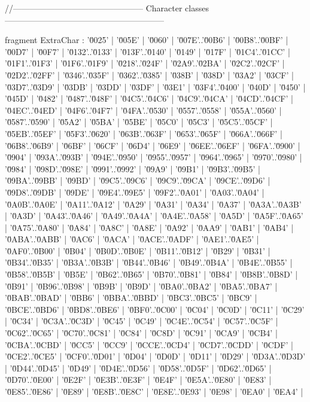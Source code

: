 //----------------------------------------------- Character classes ---------------------------------------------------------


fragment ExtraChar            : '\u0025' | '\u005E' | '\u0060' | '\u007E'..'\u00B6' | '\u00B8'..'\u00BF' | '\u00D7' | '\u00F7' | '\u0132'..'\u0133' | '\u013F'..'\u0140' | '\u0149' | '\u017F' | '\u01C4'..'\u01CC' | '\u01F1'..'\u01F3' | '\u01F6'..'\u01F9' | '\u0218'..'\u024F' | '\u02A9'..'\u02BA' | '\u02C2'..'\u02CF' | '\u02D2'..'\u02FF' | '\u0346'..'\u035F' | '\u0362'..'\u0385' | '\u038B' | '\u038D' | '\u03A2' | '\u03CF' | '\u03D7'..'\u03D9' | '\u03DB' | '\u03DD' | '\u03DF' | '\u03E1' | '\u03F4'..'\u0400' | '\u040D' | '\u0450' | '\u045D' | '\u0482' | '\u0487'..'\u048F' | '\u04C5'..'\u04C6' | '\u04C9'..'\u04CA' | '\u04CD'..'\u04CF' | '\u04EC'..'\u04ED' | '\u04F6'..'\u04F7' | '\u04FA'..'\u0530' | '\u0557'..'\u0558' | '\u055A'..'\u0560' | '\u0587'..'\u0590' | '\u05A2' | '\u05BA' | '\u05BE' | '\u05C0' | '\u05C3' | '\u05C5'..'\u05CF' | '\u05EB'..'\u05EF' | '\u05F3'..'\u0620' | '\u063B'..'\u063F' | '\u0653'..'\u065F' | '\u066A'..'\u066F' | '\u06B8'..'\u06B9' | '\u06BF' | '\u06CF' | '\u06D4' | '\u06E9' | '\u06EE'..'\u06EF' | '\u06FA'..'\u0900' | '\u0904' | '\u093A'..'\u093B' | '\u094E'..'\u0950' | '\u0955'..'\u0957' | '\u0964'..'\u0965' | '\u0970'..'\u0980' | '\u0984' | '\u098D'..'\u098E' | '\u0991'..'\u0992' | '\u09A9' | '\u09B1' | '\u09B3'..'\u09B5' | '\u09BA'..'\u09BB' | '\u09BD' | '\u09C5'..'\u09C6' | '\u09C9'..'\u09CA' | '\u09CE'..'\u09D6' | '\u09D8'..'\u09DB' | '\u09DE' | '\u09E4'..'\u09E5' | '\u09F2'..'\u0A01' | '\u0A03'..'\u0A04' | '\u0A0B'..'\u0A0E' | '\u0A11'..'\u0A12' | '\u0A29' | '\u0A31' | '\u0A34' | '\u0A37' | '\u0A3A'..'\u0A3B' | '\u0A3D' | '\u0A43'..'\u0A46' | '\u0A49'..'\u0A4A' | '\u0A4E'..'\u0A58' | '\u0A5D' | '\u0A5F'..'\u0A65' | '\u0A75'..'\u0A80' | '\u0A84' | '\u0A8C' | '\u0A8E' | '\u0A92' | '\u0AA9' | '\u0AB1' | '\u0AB4' | '\u0ABA'..'\u0ABB' | '\u0AC6' | '\u0ACA' | '\u0ACE'..'\u0ADF' | '\u0AE1'..'\u0AE5' | '\u0AF0'..'\u0B00' | '\u0B04' | '\u0B0D'..'\u0B0E' | '\u0B11'..'\u0B12' | '\u0B29' | '\u0B31' | '\u0B34'..'\u0B35' | '\u0B3A'..'\u0B3B' | '\u0B44'..'\u0B46' | '\u0B49'..'\u0B4A' | '\u0B4E'..'\u0B55' | '\u0B58'..'\u0B5B' | '\u0B5E' | '\u0B62'..'\u0B65' | '\u0B70'..'\u0B81' | '\u0B84' | '\u0B8B'..'\u0B8D' | '\u0B91' | '\u0B96'..'\u0B98' | '\u0B9B' | '\u0B9D' | '\u0BA0'..'\u0BA2' | '\u0BA5'..'\u0BA7' | '\u0BAB'..'\u0BAD' | '\u0BB6' | '\u0BBA'..'\u0BBD' | '\u0BC3'..'\u0BC5' | '\u0BC9' | '\u0BCE'..'\u0BD6' | '\u0BD8'..'\u0BE6' | '\u0BF0'..'\u0C00' | '\u0C04' | '\u0C0D' | '\u0C11' | '\u0C29' | '\u0C34' | '\u0C3A'..'\u0C3D' | '\u0C45' | '\u0C49' | '\u0C4E'..'\u0C54' | '\u0C57'..'\u0C5F' | '\u0C62'..'\u0C65' | '\u0C70'..'\u0C81' | '\u0C84' | '\u0C8D' | '\u0C91' | '\u0CA9' | '\u0CB4' | '\u0CBA'..'\u0CBD' | '\u0CC5' | '\u0CC9' | '\u0CCE'..'\u0CD4' | '\u0CD7'..'\u0CDD' | '\u0CDF' | '\u0CE2'..'\u0CE5' | '\u0CF0'..'\u0D01' | '\u0D04' | '\u0D0D' | '\u0D11' | '\u0D29' | '\u0D3A'..'\u0D3D' | '\u0D44'..'\u0D45' | '\u0D49' | '\u0D4E'..'\u0D56' | '\u0D58'..'\u0D5F' | '\u0D62'..'\u0D65' | '\u0D70'..'\u0E00' | '\u0E2F' | '\u0E3B'..'\u0E3F' | '\u0E4F' | '\u0E5A'..'\u0E80' | '\u0E83' | '\u0E85'..'\u0E86' | '\u0E89' | '\u0E8B'..'\u0E8C' | '\u0E8E'..'\u0E93' | '\u0E98' | '\u0EA0' | '\u0EA4' | 